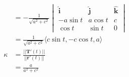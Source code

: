 \documentclass{article}
\begin{document}
\begin{align*}
                                                     & = -\frac{1}{\sqrt{a^2 + c^2}} \begin{vmatrix}
                                                                                       \hat{\mathbf{i}} & \hat{\mathbf{j}} & \hat{\mathbf{k}} \\
                                                                                       -a \sin t        & a \cos t         & c                \\
                                                                                       \cos t           & \sin t           & 0
                                                                                     \end{vmatrix} \\
                                                     & = \frac{1}{\sqrt{a^2 + c^2}} \langle c \sin t, -c \cos t, a \rangle                                                            \\
  \kappa                                             & = \frac{||\mathbf{T}'(t)||}{||\mathbf{r}'(t)||}                                                                                \\
                                                     & = \frac{a}{a^2 + c^2}
\end{align*}

\setcounter{subsubsection}{4}
\subsubsection{}
\end{document}
